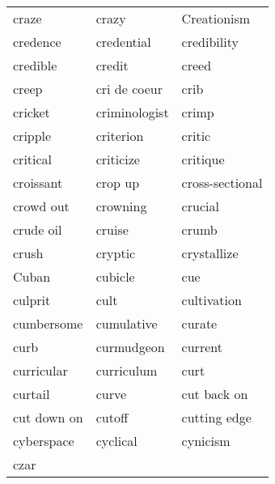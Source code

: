 \documentclass{minimal}
\begin{document}
\begin{longtable}{p{2.7cm}@{\hskip 0.2cm}p{2.7cm}@{\hskip 0.2cm}p{2.7cm}}
craze & crazy & Creationism \\
credence & credential & credibility \\
credible & credit & creed \\
creep & cri de coeur & crib \\
cricket & criminologist & crimp \\
cripple & criterion & critic \\
critical & criticize & critique \\
croissant & crop up & cross-sectional \\
crowd out & crowning & crucial \\
crude oil & cruise & crumb \\
crush & cryptic & crystallize \\
Cuban & cubicle & cue \\
culprit & cult & cultivation \\
cumbersome & cumulative & curate \\
curb & curmudgeon & current \\
curricular & curriculum & curt \\
curtail & curve & cut back on \\
cut down on & cutoff & cutting edge \\
cyberspace & cyclical & cynicism \\
czar
\end{longtable}
\end{document}
